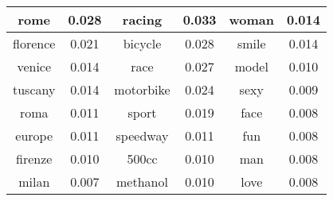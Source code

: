 \begin{table}[htp]
\begin{tabular}{|c|c|c|c|c|c|}
rome&0.028&racing&0.033&woman&0.014\\ \hline
florence&0.021&bicycle&0.028&smile&0.014\\ \hline
venice&0.014&race&0.027&model&0.010\\ \hline
tuscany&0.014&motorbike&0.024&sexy&0.009\\ \hline
roma&0.011&sport&0.019&face&0.008\\ \hline
europe&0.011&speedway&0.011&fun&0.008\\ \hline
firenze&0.010&500cc&0.010&man&0.008\\ \hline
milan&0.007&methanol&0.010&love&0.008\\ \hline
\end{tabular}
\end{table}



